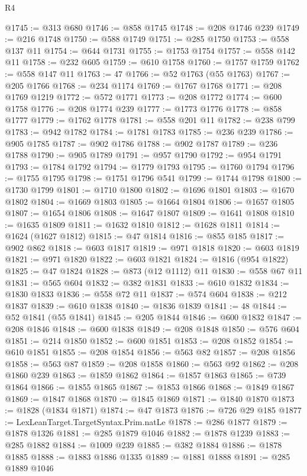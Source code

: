 \begin{lexlean}{R4}
\begin{coremodule}
@1745 := @313 @680
@1746 := @858 @1745
@1748 := @208 @1746 @239
@1749 := @216 @1748
@1750 := @588 @1749
@1751 := @285 @1750
@1753 := @558 @137 @11
@1754 := @644 @1731
@1755 := @1753 @1754
@1757 := @558 @142 @11
@1758 := @232 @605
@1759 := @610 @1758
@1760 := @1757 @1759
@1762 := @558 @147 @11
@1763 := 47
@1766 := @52 @1763 (@55 @1763)
@1767 := @205 @1766
@1768 := @234 @1174
@1769 := @1767 @1768
@1771 := @208 @1769 @1219
@1772 := @572 @1771
@1773 := @208 @1772
@1774 := @600 @1758
@1776 := @208 @1774 @239
@1777 := @1773 @1776
@1778 := @858 @1777
@1779 := @1762 @1778
@1781 := @558 @201 @11
@1782 := @238 @799
@1783 := @942 @1782
@1784 := @1781 @1783
@1785 := @236 @239
@1786 := @905 @1785
@1787 := @902 @1786
@1788 := @902 @1787
@1789 := @236 @1788
@1790 := @905 @1789
@1791 := @957 @1790
@1792 := @954 @1791
@1793 := @1784 @1792
@1794 := @1779 @1793
@1795 := @1760 @1794
@1796 := @1755 @1795
@1798 := @1751 @1796 @541
@1799 := @1744 @1798
@1800 := @1730 @1799
@1801 := @1710 @1800
@1802 := @1696 @1801
@1803 := @1670 @1802
@1804 := @1669 @1803
@1805 := @1664 @1804
@1806 := @1657 @1805
@1807 := @1654 @1806
@1808 := @1647 @1807
@1809 := @1641 @1808
@1810 := @1635 @1809
@1811 := @1632 @1810
@1812 := @1628 @1811
@1814 := @1624 (@1627 @1812)
@1815 := @47 @1814
@1816 := @855 @185
@1817 := @902 @862
@1818 := @603 @1817
@1819 := @971 @1818
@1820 := @603 @1819
@1821 := @971 @1820
@1822 := @603 @1821
@1824 := @1816 (@954 @1822)
@1825 := @47 @1824
@1828 := @873 (@12 @1112) @11
@1830 := @558 @67 @11
@1831 := @565 @604
@1832 := @382 @1831
@1833 := @610 @1832
@1834 := @1830 @1833
@1836 := @558 @72 @11
@1837 := @574 @604
@1838 := @212 @1837
@1839 := @610 @1838
@1840 := @1836 @1839
@1841 := 48
@1844 := @52 @1841 (@55 @1841)
@1845 := @205 @1844
@1846 := @600 @1832
@1847 := @208 @1846
@1848 := @600 @1838
@1849 := @208 @1848
@1850 := @576 @604
@1851 := @214 @1850
@1852 := @600 @1851
@1853 := @208 @1852
@1854 := @610 @1851
@1855 := @208 @1854
@1856 := @563 @82
@1857 := @208 @1856
@1858 := @563 @87
@1859 := @208 @1858
@1860 := @563 @92
@1862 := @208 @1860 @239
@1863 := @1859 @1862
@1864 := @1857 @1863
@1865 := @739 @1864
@1866 := @1855 @1865
@1867 := @1853 @1866
@1868 := @1849 @1867
@1869 := @1847 @1868
@1870 := @1845 @1869
@1871 := @1840 @1870
@1873 := @1828 (@1834 @1871)
@1874 := @47 @1873
@1876 := @726 @29 @185
@1877 := LexLeanTarget.TargetSyntax.Prim.natLe
@1878 := @286 @1877
@1879 := @1878 @1326
@1881 := @285 @1879 @1046
@1882 := @1878 @1239
@1883 := @285 @1882
@1884 := @1009 @239
@1885 := @382 @1884
@1886 := @1878 @1885
@1888 := @1883 @1886 @1335
@1889 := @1881 @1888
@1891 := @285 @1889 @1046

\end{coremodule}
\end{lexlean}
